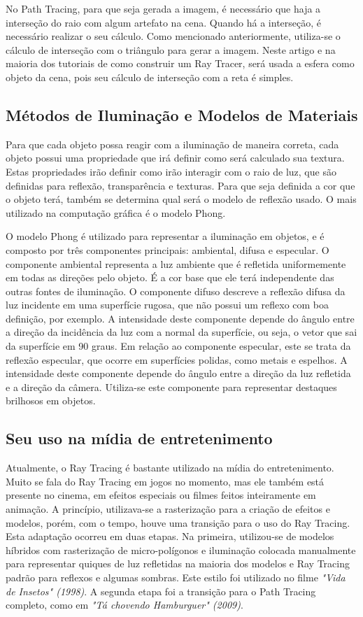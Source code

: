 \documentclass[journal]{IEEEtran}
\begin{document}
No Path Tracing, para que seja gerada a imagem, é necessário que haja a interseção
do raio com algum artefato na cena. Quando há a interseção, é necessário realizar
o seu cálculo. Como mencionado anteriormente, utiliza-se o cálculo de interseção
com o triângulo para gerar a imagem. Neste artigo e na maioria dos tutoriais
de como construir um Ray Tracer, será usada a esfera como objeto da cena, pois
seu cálculo de interseção com a reta é simples.


\subsection{Métodos de Iluminação e Modelos de Materiais}
Para que cada objeto possa reagir com a iluminação de maneira correta, cada objeto
possui uma propriedade que irá definir como será calculado sua textura. Estas propriedades
irão definir como irão interagir com o raio de luz, que são definidas para reflexão,
transparência e texturas. Para que seja definida a cor que o objeto terá, também se
determina qual será o modelo de reflexão usado. O mais utilizado na computação gráfica
é o modelo Phong.

O modelo Phong é utilizado para representar a iluminação em objetos, e é composto por
três componentes principais: ambiental, difusa e especular. O componente ambiental 
representa a luz ambiente que é refletida uniformemente em todas as direções pelo objeto.
É a cor base que ele terá independente das outras fontes de iluminação. O componente 
difuso descreve a reflexão difusa da luz incidente em uma superfície rugosa, que não
possui um reflexo com boa definição, por exemplo. A intensidade deste componente depende
do ângulo entre a direção da incidência da luz com a normal da superfície, ou seja, o 
vetor que sai da superfície em 90 graus. Em relação ao componente especular, este se 
trata da reflexão especular, que ocorre em superfícies polidas, como metais e espelhos.
A intensidade deste componente depende do ângulo entre a direção da luz refletida e a 
direção da câmera. Utiliza-se este componente para representar destaques brilhosos em
objetos.

\subsection{Seu uso na mídia de entretenimento}
Atualmente, o Ray Tracing é bastante utilizado na mídia do entretenimento. Muito se 
fala do Ray Tracing em jogos no momento, mas ele também está presente no cinema, em
efeitos especiais ou filmes feitos inteiramente em animação. A princípio, utilizava-se
a rasterização para a criação de efeitos e modelos, porém, com o tempo, houve uma 
transição para o uso do Ray Tracing. Esta adaptação ocorreu em duas
etapas. Na primeira, utilizou-se de modelos híbridos com rasterização de micro-polígonos
e iluminação colocada manualmente para representar quiques de luz refletidas na maioria
dos modelos e Ray Tracing padrão para reflexos e algumas sombras. Este estilo foi utilizado
no filme \emph{"Vida de Insetos" (1998)}. A segunda etapa foi a transição para o Path
Tracing completo, como em \emph{"Tá chovendo Hamburguer" (2009)}.
\cite{c3} \cite{c1}
\end{document}
